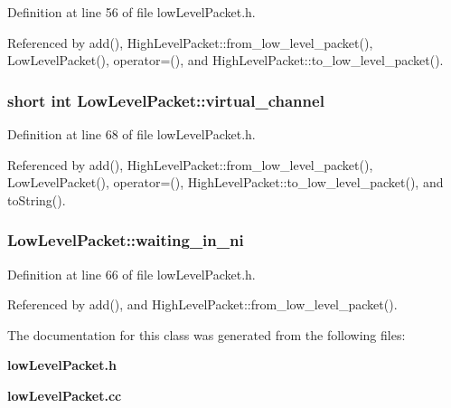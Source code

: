 Definition at line 56 of file lowLevelPacket.h.

Referenced by add(), HighLevelPacket::from\_\-low\_\-level\_\-packet(), LowLevelPacket(), operator=(), and HighLevelPacket::to\_\-low\_\-level\_\-packet().
\subsubsection[{virtual\_\-channel}]{\setlength{\rightskip}{0pt plus 5cm}short int {\bf LowLevelPacket::virtual\_\-channel}}\label{classLowLevelPacket_3fa4ac5563bbf3005a809c0b193f4c84}




Definition at line 68 of file lowLevelPacket.h.

Referenced by add(), HighLevelPacket::from\_\-low\_\-level\_\-packet(), LowLevelPacket(), operator=(), HighLevelPacket::to\_\-low\_\-level\_\-packet(), and toString().
\subsubsection[{waiting\_\-in\_\-ni}]{ {\bf LowLevelPacket::waiting\_\-in\_\-ni}}\label{classLowLevelPacket_d6a9b48c6d2c4576519fa38e8166b356}




Definition at line 66 of file lowLevelPacket.h.

Referenced by add(), and HighLevelPacket::from\_\-low\_\-level\_\-packet().

The documentation for this class was generated from the following files:\begin{CompactItemize}
\item 
{\bf lowLevelPacket.h}\item 
{\bf lowLevelPacket.cc}\end{CompactItemize}
